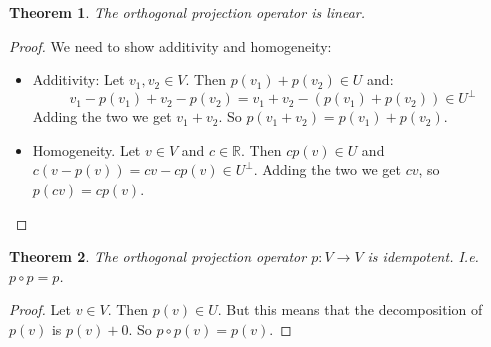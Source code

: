 \documentclass[12pt, a4paper]{article}
\newtheorem{theorem}{Theorem}[section]
\numberwithin{equation}{section}
\begin{document}
\begin{theorem}
The orthogonal projection operator is linear.
\end{theorem}
\begin{proof}
We need to show additivity and homogeneity:
\begin{itemize}
\item Additivity: Let $v_1,v_2\in V$. Then $p(v_1)+p(v_2)\in U$ and:
\begin{equation}
v_1-p(v_1)+v_2-p(v_2)=v_1+v_2-(p(v_1)+p(v_2))\in U^\perp
\end{equation}
Adding the two we get $v_1+v_2$. So $p(v_1+v_2)=p(v_1)+p(v_2)$.
\item Homogeneity. Let $v\in V$ and $c\in\mathbb{R}$. Then $cp(v)\in U$ and $c(v-p(v))=cv-cp(v)\in U^\perp$. Adding the two we get $cv$, so $p(cv)=cp(v)$. 
\end{itemize}
\end{proof}

\begin{theorem}
The orthogonal projection operator $p:V\rightarrow V$ is idempotent. I.e. $p\circ p=p$.
\end{theorem}
\begin{proof}
Let $v\in V$. Then $p(v)\in U$. But this means that the decomposition of $p(v)$ is $p(v)+0$. So $p\circ p(v)=p(v)$.
\end{proof}
\end{document}
